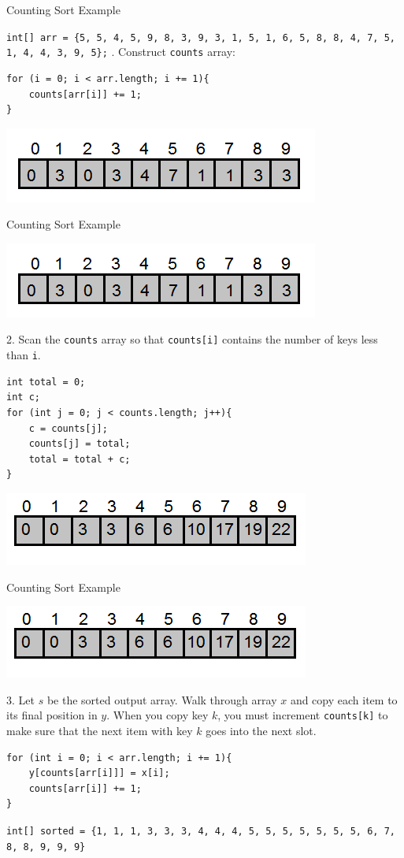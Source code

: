 \documentclass[9pt]{beamer}
\begin{document}
\begin{frame}[fragile]{Counting Sort Example}

{\tt int[] arr = \{5, 5, 4, 5, 9, 8, 3, 9, 3, 1, 5, 1, 6, 5, 8, 8, 4, 7, 5, 1, 4, 4, 3, 9, 5\};} \newline {}. Construct {\tt counts} array:
\begin{lstlisting}
for (i = 0; i < arr.length; i += 1){
    counts[arr[i]] += 1;
}
\end{lstlisting}
\centerline{\includegraphics[scale=0.5]{1.png}}
\end{frame}

\begin{frame}[fragile]{Counting Sort Example}
\centerline{\includegraphics[scale=0.5]{1.png}}

2. Scan the {\tt counts} array so that {\tt counts[i]} contains the number of keys less than {\tt i}.
\begin{lstlisting}
int total = 0;
int c;
for (int j = 0; j < counts.length; j++){
    c = counts[j];
    counts[j] = total;
    total = total + c;
}
\end{lstlisting}
\centerline{\includegraphics[scale=0.5]{2.png}}
\end{frame}

\begin{frame}[fragile]{Counting Sort Example}
\centerline{\includegraphics[scale=0.5]{2.png}}

3. Let $s$ be the sorted output array. Walk through array $x$ and copy each item to its final position in $y$. When you copy key $k$, you must increment {\tt counts[k]} to make sure that the next item with key $k$ goes into the next slot.
 {
  \begin{lstlisting}
for (int i = 0; i < arr.length; i += 1){
    y[counts[arr[i]]] = x[i];
    counts[arr[i]] += 1;
}
  \end{lstlisting}
  }
{\tt \small int[] sorted = \{1, 1, 1, 3, 3, 3, 4, 4, 4, 5, 5, 5, 5, 5, 5, 5, 6, 7, 8, 8, 9, 9, 9\}}
\end{frame}
\end{document}
